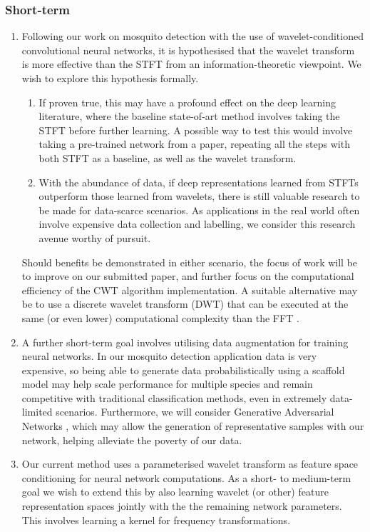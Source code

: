\documentclass[12pt]{llncs}
\begin{document}
\subsubsection{Short-term}
\begin{enumerate}
\item Following our work on mosquito detection with the use of wavelet-conditioned convolutional neural networks, it is hypothesised that the wavelet transform is more effective than the STFT from an information-theoretic viewpoint. We wish to explore this hypothesis formally. 
\begin{enumerate}
\item If proven true, this may have a profound effect on the deep learning literature, where the baseline state-of-art method involves taking the STFT before further learning. A possible way to test this would involve taking a pre-trained network from a paper, repeating all the steps with both STFT as a baseline, as well as the wavelet transform.
\item With the abundance of data, if deep representations learned from STFTs outperform those learned from wavelets, there is still valuable research to be made for data-scarce scenarios. As applications in the real world often involve expensive data collection and labelling, we consider this research avenue worthy of pursuit. 
\end{enumerate}
Should benefits be demonstrated in either scenario, the focus of work will be to improve on our submitted paper, and further focus on the computational efficiency of the CWT algorithm implementation. A suitable alternative may be to use a discrete wavelet transform (DWT) that can be executed at the same (or even lower) computational complexity than the FFT \cite{rioul1992fast}.
\item A further short-term goal involves utilising data augmentation for training neural networks. In our mosquito detection application data is very expensive, so being able to generate data probabilistically using a scaffold model may help scale performance for multiple species and remain competitive with traditional classification methods, even in extremely data-limited scenarios. Furthermore, we will consider Generative Adversarial Networks \cite{radford2015unsupervised}, which may allow the generation of representative samples with our network, helping alleviate the poverty of our data. 

\item Our current method uses a parameterised wavelet transform as feature space conditioning for neural network computations. As a short- to medium-term goal we wish to extend this by also learning wavelet (or other) feature representation spaces jointly with the the remaining network parameters. This involves learning a kernel for frequency transformations. 


\end{enumerate}
\end{document}
